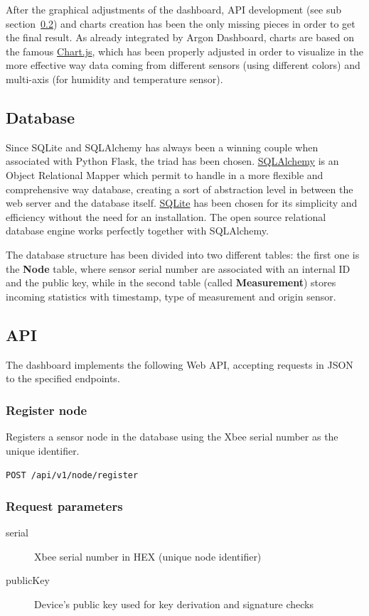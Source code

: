 \documentclass[a4paper,11pt]{scrartcl}
\begin{document}
After the graphical adjustments of the dashboard, API development (see sub section~\ref{subsec:api}) and charts creation has been the only missing pieces in order to get the final result. As already integrated by Argon Dashboard, charts are based on the famous \href{https://www.chartjs.org/}{Chart.js}, which has been properly adjusted in order to visualize in the more effective way data coming from different sensors (using different colors) and multi-axis (for humidity and temperature sensor).

\subsection{Database}\label{subsec:database}
Since SQLite and SQLAlchemy has always been a winning couple when associated with Python Flask, the triad has been chosen.
\href{https://www.sqlalchemy.org/}{SQLAlchemy} is an Object Relational Mapper which permit to handle in a more flexible and comprehensive way database, creating a sort of abstraction level in between the web server and the database itself. \href{https://www.sqlite.org/index.html}{SQLite} has been chosen for its simplicity and efficiency without the need for an installation. The open source relational database engine works perfectly together with SQLAlchemy.

The database structure has been divided into two different tables: the first one is the \textbf{Node} table, where sensor serial number are associated with an internal ID and the public key, while in the second table (called \textbf{Measurement}) stores incoming statistics with timestamp, type of measurement and origin sensor.

\subsection{API}\label{subsec:api}
The dashboard implements the following Web API, accepting requests in JSON to the specified endpoints.

\subsubsection{Register node}
Registers a sensor node in the database using the Xbee serial number as the unique identifier.

\texttt{POST /api/v1/node/register}

\subsubsection*{Request parameters}
\begin{description}
\item[serial] Xbee serial number in HEX (unique node identifier)
\item[publicKey] Device's public key used for key derivation and signature checks
\end{description}
\end{document}
